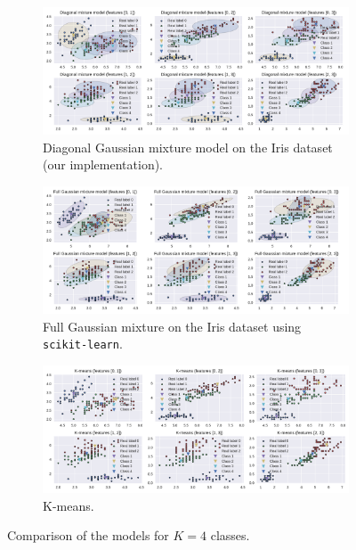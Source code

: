 \documentclass[11pt]{article}
\begin{document}
\begin{figure}
	\centering
	\begin{subfigure}[t]{.95\linewidth}
		\includegraphics[width=\linewidth]{images/diag_em_K4.pdf}
		\caption{Diagonal Gaussian mixture model on the Iris dataset (our implementation).}
	\end{subfigure}
	\begin{subfigure}[t]{.95\linewidth}
		\includegraphics[width=\linewidth]{images/full_em_K4.pdf}
		\caption{Full Gaussian mixture on the Iris dataset using \texttt{scikit-learn}.}
	\end{subfigure}
	\begin{subfigure}[t]{.95\linewidth}
		\includegraphics[width=\linewidth]{images/kmeans_K4.pdf}
		\caption{K-means.}
	\end{subfigure}
	\caption{Comparison of the models for $K=4$ classes.}\label{fig:EMdiagfullComparisonK4}
\end{figure}
\end{document}
